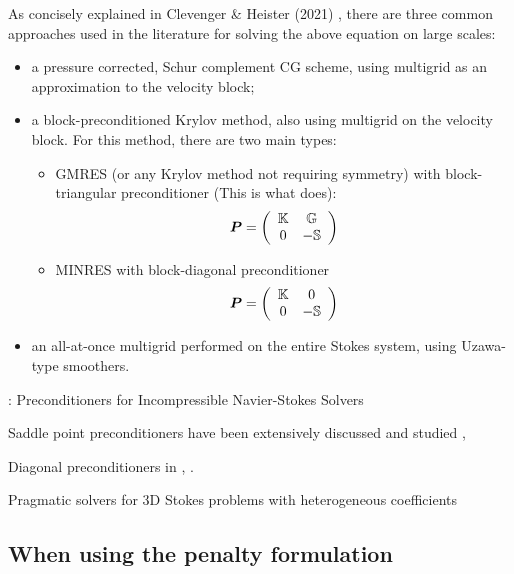 As concisely explained in Clevenger \& Heister (2021) \cite{clhe21}, 
there are three common approaches used in the literature for solving the above equation on large scales:
\begin{itemize}
\item a pressure corrected, Schur complement CG scheme, using multigrid as an 
approximation to the velocity block;
\item a block-preconditioned Krylov
method, also using multigrid on the velocity block.
For this method, there are two main types:
\begin{itemize}
\item GMRES\cite{mabl15,rumi15} (or any Krylov method not requiring symmetry) with
block-triangular preconditioner (This is what \aspect does):
\[
{\bm P} = \left(
\begin{array}{cc}
{\mathbb{K}} & {\mathbb{G}} \\
0 & - {\mathbb{S}}
\end{array}
\right)
\]

\item MINRES\cite{gmhj16} with block-diagonal preconditioner
\[
{\bm P} = \left(
\begin{array}{cc}
{\mathbb{K}} & 0 \\
0 & - {\mathbb{S}}
\end{array}
\right)
\]

\end{itemize}


\item an all-at-once multigrid performed on the entire Stokes
system, using Uzawa-type smoothers.
\end{itemize}


\Literature: Preconditioners for Incompressible Navier-Stokes Solvers \cite{seuv10}

Saddle point preconditioners have been extensively discussed and studied \cite{bewa08}, \cite{dewu04}

Diagonal preconditioners in \cite{shrb01}, \cite{babc94}.

Pragmatic solvers for 3D Stokes problems with heterogeneous coefficients \cite{samb20}

\subsection{When using the penalty formulation}

